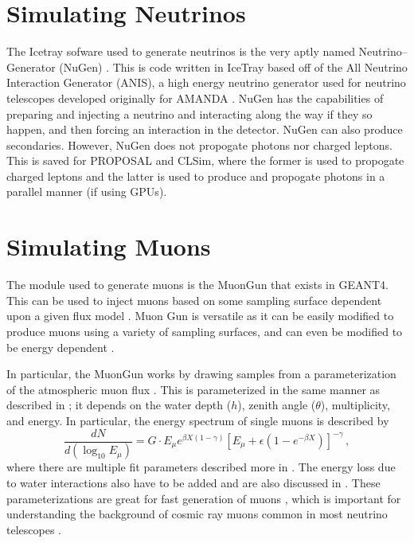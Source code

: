 \section{Simulating Neutrinos}

The Icetray sofware used to generate neutrinos is the very aptly named Neutrino--Generator (NuGen) \cite{icetray, icetray_art}. This is code written in IceTray based off of the All Neutrino Interaction Generator (ANIS), a high energy neutrino generator used for neutrino telescopes developed originally for AMANDA \cite{lepton_inj}. NuGen has the capabilities of preparing and injecting a neutrino and interacting along the way if they so happen, and then forcing an interaction in the detector. NuGen can also produce secondaries. However, NuGen does not propogate photons nor charged leptons. This is saved for PROPOSAL and CLSim, where the former is used to propogate charged leptons and the latter is used to produce and propogate photons in a parallel manner (if using GPUs).

\section{Simulating Muons}

The module used to generate muons is the MuonGun that exists in GEANT4. This can be used to inject muons based on some sampling surface dependent upon a given flux model \cite{icetray}. Muon Gun is versatile as it can be easily modified to produce muons using a variety of sampling surfaces, and can even be modified to be energy dependent \cite{icetray}.

In particular, the MuonGun works by drawing samples from a parameterization of the atmospheric muon flux \cite{icetray}. This is parameterized in the same manner as described in \cite{muon_flux}; it depends on the water depth ($h$), zenith angle ($\theta$), multiplicity, and energy. In particular, the energy spectrum of single muons is described by
\begin{equation}
  \frac{dN}{d(\log_{10}E_{\mu})} = G\cdot E_{\mu}e^{\beta X(1 - \gamma)}\left[E_{\mu} + \epsilon(1 - e^{-\beta X})\right]^{-\gamma}\, ,
\end{equation}
where there are multiple fit parameters described more in \cite{muon_flux}. The energy loss due to water interactions also have to be added and are also discussed in \cite{muon_flux}. These parameterizations are great for fast generation of muons \cite{muon_flux}, which is important for understanding the background of cosmic ray muons common in most neutrino telescopes \cite{icecube, antares, amanda, pone, muon_flux}. 


